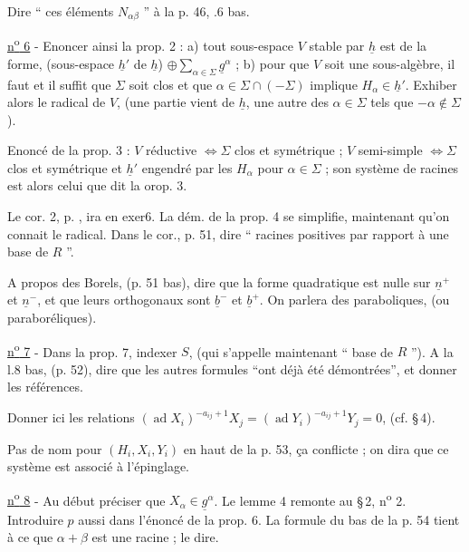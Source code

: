 Dire `` ces éléments $N_{\alpha\beta}$ '' à la p. 46, .6 bas.

\uline{n\textsuperscript{o} 6} - Enoncer ainsi la prop. 2 : a) tout sous-espace $V$ stable par $\underline{h}$ est de la forme, (sous-espace $\underline{h}'$ de $\underline{h}$) $\oplus\sum_{\alpha\in\Sigma}\underline{g}^{\alpha}$ ; b) pour que $V$ soit une sous-algèbre, il faut et il suffit que $\Sigma$ soit clos et que $\alpha\in\Sigma\cap(-\Sigma)$ implique $H_\alpha\in\underline{h}'$. Exhiber alors le radical de $V$, (une partie vient de $\underline{h}$, une autre des $\alpha\in\Sigma$ tels que $-\alpha\notin\Sigma$).

Enoncé de la prop. 3 : $V$ réductive $\Longleftrightarrow\Sigma$ clos et symétrique ; $V$ semi-simple $\Longleftrightarrow\Sigma$ clos et symétrique et $\underline{h}'$ engendré par les $H_\alpha$ pour $\alpha\in\Sigma$ ; son système de racines est alors celui que dit la orop. 3.

Le cor. 2, p. , ira en exer6. La dém. de la prop. 4 se simplifie, maintenant qu'on connait le radical. Dans le cor., p. 51, dire `` racines positives par rapport à une base de $R$ ''.

A propos des Borels, (p. 51 bas), dire que la forme quadratique est nulle sur $\underline{n}^{+}$ et $\underline{n}^{-}$, et que leurs orthogonaux sont $\underline{b}^{-}$ et $\underline{b}^{+}$. On parlera des paraboliques, (ou paraboréliques).

\uline{n\textsuperscript{o} 7} - Dans la prop. 7, indexer $S$, (qui s'appelle maintenant `` base de $R$ ''). A la l.8 bas, (p. 52), dire que les autres formules ``ont déjà été démontrées'', et donner les références.

Donner ici les relations $(\operatorname{ad}X_i)^{-a_{ij}+1}X_j=(\operatorname{ad}Y_i)^{-a_{ij}+1}Y_j=0$, (cf. \S\,4).

Pas de nom pour $(H_i,X_i,Y_i)$ en haut de la p. 53, ça conflicte ; on dira que ce système est associé à l'épinglage.

\uline{n\textsuperscript{o} 8} - Au début préciser que $X_\alpha\in\underline{g}^{\alpha}$. Le lemme 4 remonte au \S\,2, n\textsuperscript{o} 2. Introduire $p$ aussi dans l'énoncé de la prop. 6. La formule du bas de la p. 54 tient à ce que $\alpha+\beta$ est une racine ; le dire.
